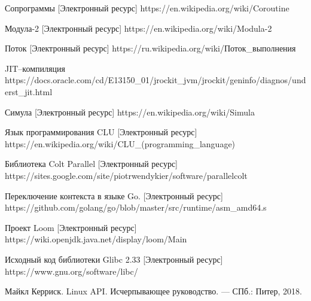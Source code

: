 \begingroup 
\renewcommand{\section}[2]{\anonsection{Библиографический список}}
\begin{thebibliography}{00}

    Сопрограммы
    [Электронный ресурс] 
    https://en.wikipedia.org/wiki/Coroutine

	Модула-2
	[Электронный ресурс] 
	https://en.wikipedia.org/wiki/Modula-2
	
	Поток
	[Электронный ресурс]
	https://ru.wikipedia.org/wiki/Поток\_выполнения
	
	JIT--компиляция
	https://docs.oracle.com/cd/E13150\_01/jrockit\_jvm/jrockit/geninfo/diagnos/underst\_jit.html
	
	Симула
	[Электронный ресурс]
	https://en.wikipedia.org/wiki/Simula
	
	Язык программирования CLU
	[Электронный ресурс]
	https://en.wikipedia.org/wiki/CLU\_(programming\_language)
	
	Библиотека Colt Parallel
	[Электронный ресурс]
	https://sites.google.com/site/piotrwendykier/software/parallelcolt
	
	Переключение контекста в языке Go.
	[Электронный ресурс]
	https://github.com/golang/go/blob/master/src/runtime/asm\_amd64.s
	
	Проект Loom
	[Электронный ресурс]
	https://wiki.openjdk.java.net/display/loom/Main
	
	Исходный код библиотеки Glibc 2.33
	[Электронный ресурс] 
	https://www.gnu.org/software/libc/ %

	Майкл Керриск. Linux API. Исчерпывающее руководство. — СПб.: Питер, 2018.

\end{thebibliography}
\endgroup

\clearpage
